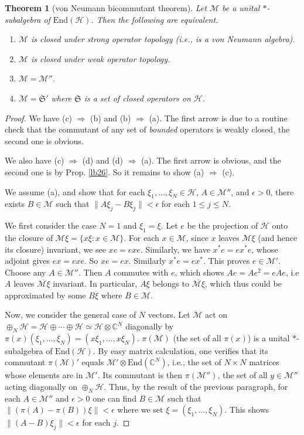 \documentclass[12pt,a4paper,notitlepage]{article}
\theoremstyle{definition}
\theoremstyle{plain}
\newtheorem{thm}[df]{Theorem}
\newcommand{\fk}{\mathfrak}
\newcommand{\mc}{\mathcal}
\newcommand{\ovl}{\overline}
\newcommand{\End}{\mathrm{End}} %
\newcommand{\Cbb}{\mathbb C}
\numberwithin{equation}{section}
\begin{document}
\begin{thm}[von Neumann bicommutant theorem]\label{lb59}
Let $\mc M$ be a unital $*$-subalgebra of $\End(\mc H)$. Then the following  are equivalent.
\begin{enumerate}[label=(\alph*)]
\item $\mc M$ is closed under strong operator topology (i.e., is a von Neumann algebra).
\item $\mc M$ is closed under weak operator topology. 
\item $\mc M=\mc M''$.
\item $\mc M=\fk S'$ where $\fk S$ is a set of closed operators on $\mc H$.
\end{enumerate}	



\end{thm}	

\begin{proof}
	We have (c) $\Rightarrow$ (b)  and (b) $\Rightarrow$ (a). The first arrow is due to a routine check that the commutant of any set of \textit{bounded} operators is weakly closed, the second one is obvious.
	
	We also have (c) $\Rightarrow$ (d)  and (d) $\Rightarrow$ (a). The first arrow is obvious, and the second one is by Prop. \ref{lb26}. So it remains to show (a) $\Rightarrow$ (c).
	
	
	
	We assume (a), and  show that for each $\xi_1,\dots,\xi_N\in\mc H$, $A\in\mc M''$, and $\epsilon>0$, there exists $B\in\mc M$ such that $\lVert A\xi_j-B\xi_j\lVert<\epsilon$ for each $1\leq j\leq N$.
	
	We first consider the case $N=1$ and $\xi_1=\xi$. Let $e$ be the projection of $\mc H$ onto the closure of $\mc M\xi=\{x\xi:x\in\mc M\}$. For each $x\in\mc M$, since $x$ leaves $\mc M\xi$ (and hence its closure) invariant, we see $xe=exe$. Similarly, we have $x^*e=ex^*e$, whose adjoint gives $ex=exe$. So $xe=ex$. Similarly $x^*e=ex^*$. This proves $e\in\mc M'$. Choose any $A\in\mc M''$. Then $A$ commutes with $e$, which shows $Ae=Ae^2=eAe$, i.e $A$ leaves $\ovl{\mc M\xi}$ invariant. In particular, $A\xi$ belongs to $\ovl{\mc M\xi}$, which thus could be approximated by some $B\xi$ where $B\in\mc M$.
	
	Now, we consider the general case of $N$ vectors. Let $\mc M$ act on $\oplus_N\mc H=\mc H\oplus\cdots\oplus\mc H\simeq\mc H\otimes\Cbb^N$ diagonally by $\pi(x)(\xi_1,\dots,\xi_N)=(x\xi_1,\dots,x\xi_N)$. $\pi(\mc M)$ (the set of all $\pi(x)$) is a unital $*$-subalgebra of $\End(\mc H)$. By easy matrix calculation, one verifies that its commutant $\pi(\mc M)'$ equals $\mc M'\otimes\End(\Cbb^N)$, i.e., the set of $N\times N$ matrices whose elements are in $\mc M'$. Its commutant is then $\pi(\mc M'')$, the set of all $y\in\mc M''$ acting diagonally on $\oplus_N\mc H$. Thus, by the result of the previous paragraph, for each $A\in\mc M''$ and $\epsilon>0$ one can find $B\in\mc M$ such that $\lVert (\pi(A)-\pi(B))\xi\lVert<\epsilon$ where we set $\xi=(\xi_1,\dots,\xi_N)$. This shows $\lVert (A-B)\xi_j\lVert<\epsilon$ for each $j$.
\end{proof}
\end{document}
